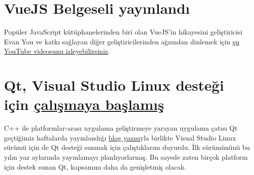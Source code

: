 \documentclass[11pt]{article}
\begin{document}
\section{VueJS Belgeseli yayınlandı}
\label{sec:org1380e19}
Popüler JavaScript kütüphanelerinden biri olan VueJS'in hikayesini
geliştiricisi Evan You ve katkı sağlayan diğer geliştiricilerinden ağzından
dinlemek için \href{https://www.youtube.com/watch?v=OrxmtDw4pVI}{şu YouTube videosunu izleyebilirsiniz}.
\section{Qt, Visual Studio Linux desteği için \href{https://devblogs.microsoft.com/cppblog/qt-to-support-visual-studio-linux-projects/}{çalışmaya başlamış}}
\label{sec:org1fae992}
C++ ile platformlar-arası uygulama geliştirmeye yarayan uygulama çatısı Qt
geçtiğimiz haftalarda yayınlandığı \href{https://www.qt.io/blog/cross-platform-development-with-qt-and-visual-studio}{blog yazısı}yla birlikte Visual Studio Linux
sürümü için de Qt desteği sunmak için çalıştıklarını duyurdu. İlk sürümününü
bu yılın yaz aylarında yayınlamayı planlıyorlarmış. Bu sayede zaten birçok
platform için destek sunan Qt, kapsamını daha da genişletmiş olacak.
\end{document}
